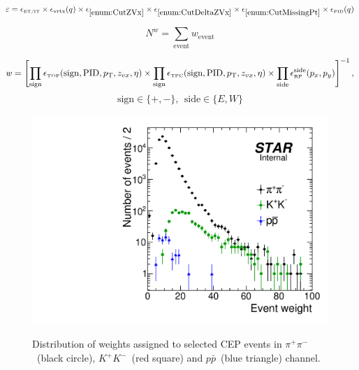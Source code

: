 \begin{equation}
	\varepsilon = \epsilon_{\textrm{\tiny ET/IT}} \times \epsilon_{\textrm{vrtx}}(q) \times \epsilon_{\ref{enum:CutZVx}} \times \epsilon_{\ref{enum:CutDeltaZVx}} \times \epsilon_{\ref{enum:CutMissingPt}} \times \epsilon_{\textrm{\tiny PID}}(q)
\end{equation}

\begin{equation}
	N^{\mathit{w}} = \sum\limits_{\textrm{event}}\mathit{w}_{\textrm{event}}
\end{equation}



\begin{equation}\label{eq:weight}
	\mathit{w} = \left[\prod\limits_{\textrm{sign}} \epsilon_{\textrm{\tiny TOF}}(\textrm{sign}, \textrm{PID}, p_{\text{T}},z_{vx},\eta)  \times \prod\limits_{\textrm{sign}} \epsilon_{\textrm{\tiny TPC}}(\textrm{sign}, \textrm{PID}, p_{\text{T}},z_{vx},\eta) \times \prod\limits_{\textrm{side}}\epsilon_{\textrm{\tiny RP}}^{\textrm{side}}(p_{x},p_{y}) \right]^{-1},
\end{equation}
\[\textrm{sign}\in\{+,-\},~~\textrm{side}\in\{E,W\}\]

\begin{figure}[h!]
\centering%
\parbox{0.4725\textwidth}{%
  \centering%
  \includegraphics[width=\linewidth]{graphics/corrections/Weights.pdf}\label{fig:weights} 
}%
\quad%
\parbox{0.4725\textwidth}{%
    \caption[Distribution of weights assigned to selected CEP events.]{Distribution of weights assigned to selected CEP events in $\pi^{+}\pi^{-}$~(black circle), $K^{+}K^{-}$~(red square) and $p\bar{p}$~(blue triangle) channel.}\label{fig:weigths}%
}
\end{figure}





